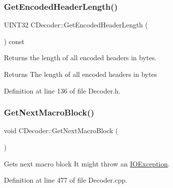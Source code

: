\subsubsection{\texorpdfstring{GetEncodedHeaderLength()}{GetEncodedHeaderLength()}}
{\footnotesize\ttfamily U\+I\+N\+T32 C\+Decoder\+::\+Get\+Encoded\+Header\+Length (\begin{DoxyParamCaption}{ }\end{DoxyParamCaption}) const\hspace{0.3cm}{\ttfamily [inline]}}

Returns the length of all encoded headers in bytes. \begin{DoxyReturn}{Returns}
The length of all encoded headers in bytes 
\end{DoxyReturn}


Definition at line 136 of file Decoder.\+h.


\begin{DoxyCode}{0}

\end{DoxyCode}
\mbox{\label{classCDecoder_ad152fbdc42a8a47960be7ba00c5fbb85}} 
\subsubsection{\texorpdfstring{GetNextMacroBlock()}{GetNextMacroBlock()}}
{\footnotesize\ttfamily void C\+Decoder\+::\+Get\+Next\+Macro\+Block (\begin{DoxyParamCaption}{ }\end{DoxyParamCaption})}

Gets next macro block It might throw an \mbox{\hyperlink{structIOException}{I\+O\+Exception}}. 

Definition at line 477 of file Decoder.\+cpp.


